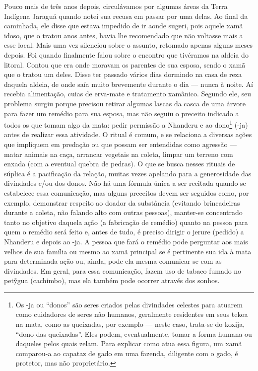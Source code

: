 Pouco mais de três anos depois, circulávamos por algumas áreas da Terra
Indígena Jaraguá quando notei sua recusa em passar por uma delas. Ao
final da caminhada, ele disse que estava impedido de ir aonde sugeri,
pois aquele xamã idoso, que o tratou anos antes, havia lhe recomendado
que não voltasse mais a esse local. Mais uma vez silenciou sobre o
assunto, retomado apenas alguns meses depois. Foi quando finalmente
falou sobre o encontro que tivéramos na aldeia do litoral. Contou que
era onde moravam os parentes de sua esposa, sendo o xamã que o tratou
um deles. Disse ter passado vários dias dormindo na casa de reza
daquela aldeia, de onde saía muito brevemente durante o dia --- nunca à
noite. Aí recebia alimentação, cuias de erva-mate e tratamento
xamânico. Segundo ele, seu problema surgiu porque precisou retirar
algumas lascas da casca de uma árvore para fazer um remédio para sua
esposa, mas não seguiu o preceito indicado a todos os que tomam algo da
mata: pedir permissão a Nhanderu e ao dono\footnote{Os -ja ou ``donos''
são seres criados pelas divindades celestes para atuarem como
cuidadores de seres não humanos, geralmente residentes em seus tekoa na
mata, como as queixadas, por exemplo --- neste caso, trata-se do koxija,
``dono das queixadas''. Eles podem, eventualmente, tomar a forma humana
ou daqueles pelos quais zelam. Para explicar como atua essa figura, um
xamã comparou-a ao capataz de gado em uma fazenda, diligente com o
gado, é protetor, mas não proprietário.} (-ja) antes de realizar essa
atividade. O ritual é comum, e se relaciona a diversas ações que
impliquem em predação ou que possam ser entendidas como agressão ---
matar animais na caça, arrancar vegetais na coleta, limpar um terreno
com enxada (com a eventual quebra de pedras). O que se busca nesses
rituais de súplica é a pacificação da relação, muitas vezes apelando
para a generosidade das divindades e/ou dos donos. Não há uma fórmula
única a ser recitada quando se estabelece essa comunicação, mas alguns
preceitos devem ser seguidos como, por exemplo, demonstrar respeito ao
doador da substância (evitando brincadeiras durante a coleta, não
falando alto com outras pessoas), manter-se concentrado tanto no
objetivo daquela ação (a fabricação de remédio) quanto na pessoa para
quem o remédio será feito e, antes de tudo, é preciso dirigir o jerure
(pedido) a Nhanderu e depois ao -ja. A pessoa que fará o remédio pode
perguntar aos mais velhos de sua família ou mesmo ao xamã principal se
é pertinente sua ida à mata para determinada ação ou, ainda, pode ela
mesma comunicar-se com as divindades. Em geral, para essa comunicação,
fazem uso de tabaco fumado no pet\~{y}gua (cachimbo), mas ela também
pode ocorrer através dos sonhos. 

